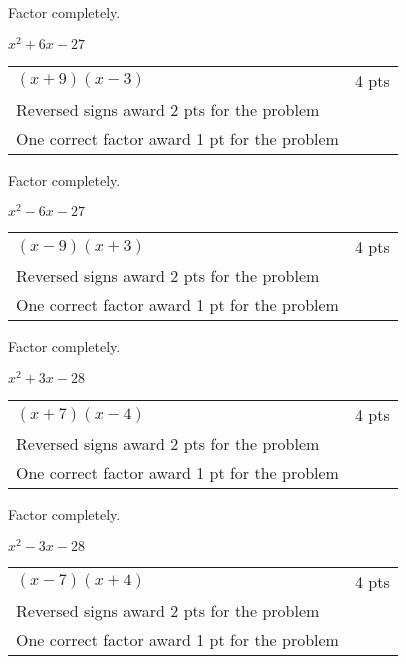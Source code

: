 {
	Factor completely.\par
	$x^2+6x-27$
}
{
	\begin{tabular}{l r}
	$(x+9)(x-3)$ & 4 pts\\
	Reversed signs award 2 pts for the problem\\
	One correct factor award 1 pt for the problem
	\end{tabular}
}

{
	Factor completely.\par
	$x^2-6x-27$
}
{
	\begin{tabular}{l r}
	$(x-9)(x+3)$ & 4 pts\\
	Reversed signs award 2 pts for the problem\\
	One correct factor award 1 pt for the problem
	\end{tabular}
}

{
	Factor completely.\par
	$x^2+3x-28$
}
{
	\begin{tabular}{l r}
	$(x+7)(x-4)$ & 4 pts \\
	Reversed signs award 2 pts for the problem\\
	One correct factor award 1 pt for the problem
	\end{tabular}
}

{
	Factor completely.\par
	$x^2-3x-28$
}
{
	\begin{tabular}{l r}
	$(x-7)(x+4)$ & 4 pts\\
	Reversed signs award 2 pts for the problem\\
	One correct factor award 1 pt for the problem
	\end{tabular}
}
